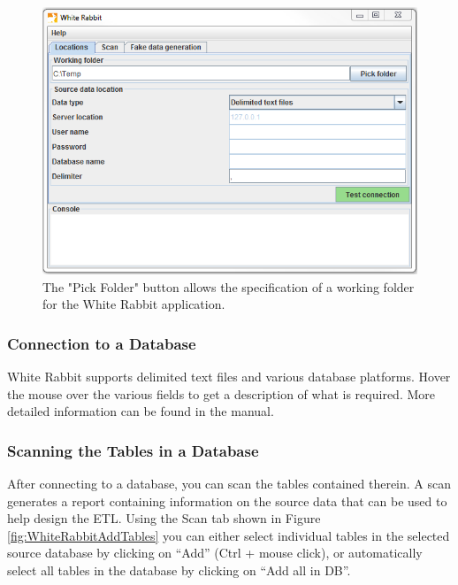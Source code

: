 \documentclass[11pt]{book}
\theoremstyle{definition}
\theoremstyle{definition}
\theoremstyle{definition}
\theoremstyle{remark}
\begin{document}
\begin{figure}

{\centering \includegraphics[width=1\linewidth]{images/ExtractTransformLoad/WhiteRabbitLocation} 

}

\caption{The "Pick Folder" button allows the specification of a working folder for the White Rabbit application.}\label{fig:WhiteRabbitLocation}
\end{figure}

\subsubsection*{Connection to a
Database}\label{connection-to-a-database}

White Rabbit supports delimited text files and various database
platforms. Hover the mouse over the various fields to get a description
of what is required. More detailed information can be found in the
manual.

\subsubsection*{Scanning the Tables in a
Database}\label{scanning-the-tables-in-a-database}

After connecting to a database, you can scan the tables contained
therein. A scan generates a report containing information on the source
data that can be used to help design the ETL. Using the Scan tab shown
in Figure \ref{fig:WhiteRabbitAddTables} you can either select
individual tables in the selected source database by clicking on ``Add''
(Ctrl + mouse click), or automatically select all tables in the database
by clicking on ``Add all in DB''.
\end{document}
